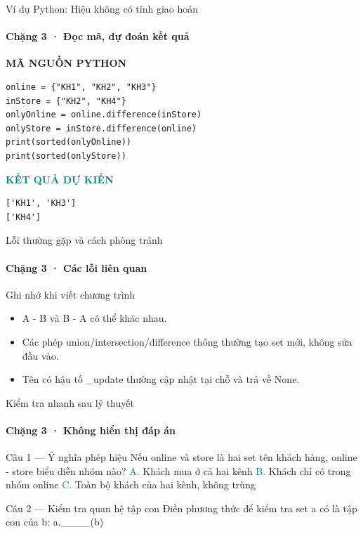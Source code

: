 \documentclass[aspectratio=169,10pt]{beamer}
\begin{document}
\begin{frame}[fragile,t]{Ví dụ Python: Hiệu không có tính giao hoán}
\framesubtitle{Chặng 3 · Đọc mã, dự đoán kết quả}
\vspace{-1mm}
{\small\color{muted}\textbf{MÃ NGUỒN PYTHON}}\par\vspace{1mm}
\begin{Verbatim}[fontsize=\scriptsize,frame=single,framesep=4mm,rulecolor=\color{teal!35},breaklines=true]
online = {"KH1", "KH2", "KH3"}
inStore = {"KH2", "KH4"}
onlyOnline = online.difference(inStore)
onlyStore = inStore.difference(online)
print(sorted(onlyOnline))
print(sorted(onlyStore))
\end{Verbatim}
\vspace{1mm}\textcolor{teal}{\scriptsize\textbf{KẾT QUẢ DỰ KIẾN}}
\begin{Verbatim}[fontsize=\scriptsize,breaklines=true]
['KH1', 'KH3']
['KH4']
\end{Verbatim}

\end{frame}

\begin{frame}[t]{Lỗi thường gặp và cách phòng tránh}
\framesubtitle{Chặng 3 · Các lỗi liên quan}
\begin{alertblock}{Ghi nhớ khi viết chương trình}
\begin{itemize}
\item A - B và B - A có thể khác nhau.
\item Các phép union/intersection/difference thông thường tạo set mới, không sửa đầu vào.
\item Tên có hậu tố \_update thường cập nhật tại chỗ và trả về None.
\end{itemize}
\end{alertblock}

\end{frame}

\begin{frame}[t]{Kiểm tra nhanh sau lý thuyết}
\framesubtitle{Chặng 3 · Không hiển thị đáp án}
\small\begin{block}{Câu 1 — Ý nghĩa phép hiệu}
Nếu online và store là hai set tên khách hàng, online - store biểu diễn nhóm nào?
\medskip
\quad \textcolor{teal}{A.} Khách mua ở cả hai kênh\hspace{3mm}
\quad \textcolor{teal}{B.} Khách chỉ có trong nhóm online\hspace{3mm}
\quad \textcolor{teal}{C.} Toàn bộ khách của hai kênh, không trùng\hspace{3mm}
\end{block}
\begin{block}{Câu 2 — Kiểm tra quan hệ tập con}
Điền phương thức để kiểm tra set a có là tập con của b: a.\_\_\_\_(b)
\end{block}
\end{frame}
\end{document}
